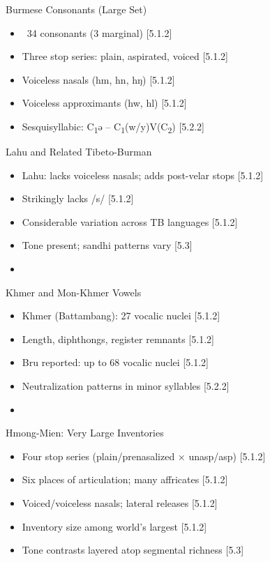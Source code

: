 \documentclass{beamer}
\newcommand{\booksrc}[1]{\hfill {\tiny [#1]}}
\begin{document}
\begin{frame}{Burmese Consonants (Large Set)}
\begin{itemize}
\item ~34 consonants (3 marginal) \booksrc{5.1.2}
\item Three stop series: plain, aspirated, voiced \booksrc{5.1.2}
\item Voiceless nasals (hm, hn, hŋ) \booksrc{5.1.2}
\item Voiceless approximants (hw, hl) \booksrc{5.1.2}
\item Sesquisyllabic: C\textsubscript{1}ə – C\textsubscript{1}(w/y)V(C\textsubscript{2}) \booksrc{5.2.2}
\end{itemize}
\end{frame}

\begin{frame}{Lahu and Related Tibeto-Burman}
\begin{itemize}
\item Lahu: lacks voiceless nasals; adds post-velar stops \booksrc{5.1.2}
\item Strikingly lacks /s/ \booksrc{5.1.2}
\item Considerable variation across TB languages \booksrc{5.1.2}
\item Tone present; sandhi patterns vary \booksrc{5.3}
\item %
\end{itemize}
\end{frame}

\begin{frame}{Khmer and Mon-Khmer Vowels}
\begin{itemize}
\item Khmer (Battambang): 27 vocalic nuclei \booksrc{5.1.2}
\item Length, diphthongs, register remnants \booksrc{5.1.2}
\item Bru reported: up to 68 vocalic nuclei \booksrc{5.1.2}
\item Neutralization patterns in minor syllables \booksrc{5.2.2}
\item %
\end{itemize}
\end{frame}

\begin{frame}{Hmong-Mien: Very Large Inventories}
\begin{itemize}
\item Four stop series (plain/prenasalized × unasp/asp) \booksrc{5.1.2}
\item Six places of articulation; many affricates \booksrc{5.1.2}
\item Voiced/voiceless nasals; lateral releases \booksrc{5.1.2}
\item Inventory size among world’s largest \booksrc{5.1.2}
\item Tone contrasts layered atop segmental richness \booksrc{5.3}
\end{itemize}
\end{frame}
\end{document}
